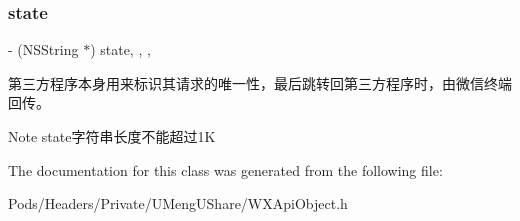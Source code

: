 \subsubsection{\texorpdfstring{state}{state}}
{\footnotesize\ttfamily -\/ (N\+S\+String $\ast$) state\hspace{0.3cm}{\ttfamily [read]}, {\ttfamily [write]}, {\ttfamily [nonatomic]}, {\ttfamily [retain]}}

第三方程序本身用来标识其请求的唯一性，最后跳转回第三方程序时，由微信终端回传。 \begin{DoxyNote}{Note}
state字符串长度不能超过1K 
\end{DoxyNote}


The documentation for this class was generated from the following file\+:\begin{DoxyCompactItemize}
\item 
Pods/\+Headers/\+Private/\+U\+Meng\+U\+Share/W\+X\+Api\+Object.\+h\end{DoxyCompactItemize}

